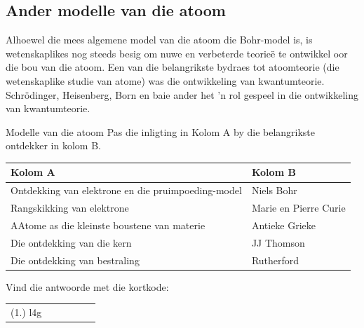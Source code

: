             \subsection*{Ander modelle van die atoom}
            \nopagebreak
            \label{m38756*eip-993}
Alhoewel die mees algemene model van die atoom die Bohr-model is, is wetenskaplikes nog steeds besig om nuwe en verbeterde teorieë te ontwikkel oor die bou van die atoom. Een van die belangrikste bydraes tot atoomteorie (die wetenskaplike studie van atome) was die ontwikkeling van kwantumteorie. Schrödinger, Heisenberg, Born en baie ander het 'n rol gespeel in die ontwikkeling van kwantumteorie. 
\par \label{m38756*eip-179}
            \begin{exercises}{Modelle van die atoom}
            \nopagebreak
            \label{m38756*eip-786}Pas die inligting in Kolom A by die belangrikste ontdekker in kolom B.
          \begin{table}[H]
        \begin{center}
      \label{m38756*eip-551}
      \begin{tabular}{|l|l|}\hline
        Kolom A &
        Kolom B \\ \hline
        Ontdekking van elektrone en die pruimpoeding-model & Niels Bohr \\ \hline
        Rangskikking van elektrone & Marie en Pierre Curie  \\ \hline
        AAtome as die kleinste boustene van materie & Antieke Grieke \\ \hline
        Die ontdekking van die kern & JJ Thomson \\ \hline
        Die ontdekking van bestraling & Rutherford \\ \hline
    \end{tabular}
      \end{center}
\end{table}
    \par
        \par 
    \label{m38756*cid3}
\par {} Vind die antwoorde met die kortkode:
 \par \begin{tabular}[h]{cccccc}
 (1.) l4g  & \end{tabular}
\end{exercises}
